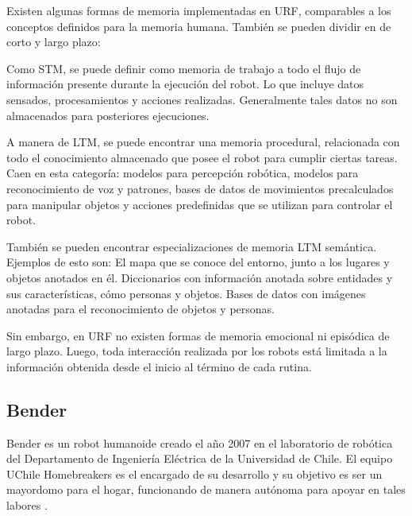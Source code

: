 Existen algunas formas de memoria implementadas en URF, comparables a los conceptos definidos para la memoria humana. También se pueden dividir en de corto y largo plazo:

Como STM, se puede definir como memoria de trabajo a todo el flujo de información presente durante la ejecución del robot. Lo que incluye datos sensados, procesamientos y acciones realizadas. Generalmente tales datos no son almacenados para posteriores ejecuciones.

A manera de LTM, se puede encontrar una memoria procedural, relacionada con todo el conocimiento almacenado que posee el robot para cumplir ciertas tareas. Caen en esta categoría: modelos para percepción robótica, modelos para reconocimiento de voz y patrones, bases de datos de movimientos precalculados para manipular objetos y acciones predefinidas que se utilizan para controlar el robot.

También se pueden encontrar especializaciones de memoria LTM semántica. Ejemplos de esto son: El mapa que se conoce del entorno, junto a los lugares y objetos anotados en él. Diccionarios con información anotada sobre entidades y sus características, cómo personas y objetos. Bases de datos con imágenes anotadas para el reconocimiento de objetos y personas. 

Sin embargo, en URF no existen formas de memoria emocional ni episódica de largo plazo. Luego, toda interacción realizada por los robots está limitada a la información obtenida desde el inicio al término de cada rutina.


\subsection{Bender}

Bender es un robot humanoide creado el año 2007 en el laboratorio de robótica del Departamento de Ingeniería Eléctrica de la Universidad de Chile. El equipo UChile Homebreakers es el encargado de su desarrollo y  su objetivo es ser un mayordomo para el hogar, funcionando de manera autónoma para apoyar en tales labores \cite{uchile-robotics}.

